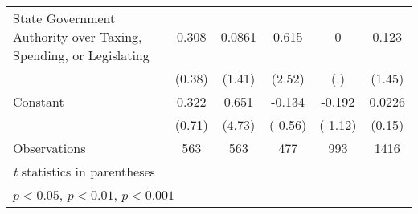 {\begin{tabular*}{\linewidth}{@{\hskip\tabcolsep\extracolsep\fill}l*{5}{c}}
\addlinespace
State Government Authority over Taxing, Spending, or Legislating&    0.308         &   0.0861         &    0.615\sym{*}  &        0         &    0.123         \\
                &   (0.38)         &   (1.41)         &   (2.52)         &      (.)         &   (1.45)         \\
\addlinespace
Constant        &    0.322         &    0.651\sym{***}&   -0.134         &   -0.192         &   0.0226         \\
                &   (0.71)         &   (4.73)         &  (-0.56)         &  (-1.12)         &   (0.15)         \\
\midrule
Observations    &      563         &      563         &      477         &      993         &     1416         \\
\bottomrule
\multicolumn{6}{l}{\footnotesize \textit{t} statistics in parentheses}\\
\multicolumn{6}{l}{\footnotesize \sym{*} \(p<0.05\), \sym{**} \(p<0.01\), \sym{***} \(p<0.001\)}\\
\end{tabular*}
}
